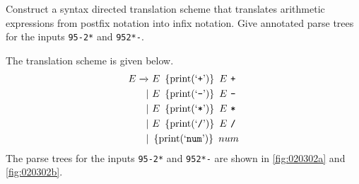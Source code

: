 \begin{exercise}\label{ex:020302}
    Construct a syntax directed translation scheme that translates arithmetic 
    expressions from postfix notation into infix notation. Give annotated parse 
    trees for the inputs \texttt{95-2*} and \texttt{952*-}.
\end{exercise}
\begin{solution}\label{sol:020302}
    The translation scheme is given below.
    \begin{align*}
        E \yld\ &E\ \cbrak{\text{print(`\texttt{+}')}}\ E\ \texttt{+} \\
             |\ &E\ \cbrak{\text{print(`\texttt{-}')}}\ E\ \texttt{-} \\
             |\ &E\ \cbrak{\text{print(`\texttt{*}')}}\ E\ \texttt{*} \\
             |\ &E\ \cbrak{\text{print(`\texttt{/}')}}\ E\ \texttt{/} \\
             |\ &\cbrak{\text{print(`\texttt{num}')}}\ num
    \end{align*}
    The parse trees for the inputs \texttt{95-2*} and \texttt{952*-} are shown 
    in \autoref{fig:020302a} and \autoref{fig:020302b}.
    

    
\end{solution}